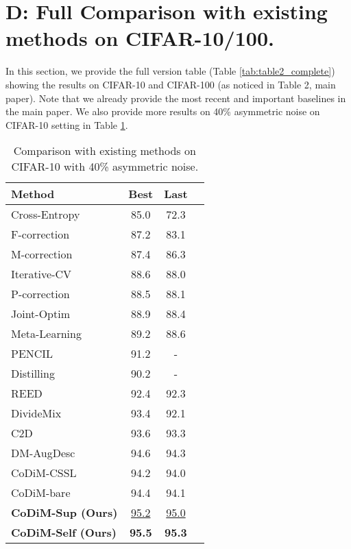 \documentclass[letterpaper]{article} \usepackage{aaai22}  \usepackage{times}  \usepackage{helvet}  \usepackage{courier}  \usepackage[hyphens]{url}  \usepackage{graphicx} \usepackage{subfigure}
\begin{document}
\section{D: Full Comparison with existing methods on CIFAR-10/100.}
In this section, we provide the full version table (Table \ref{tab:table2_complete}) showing the results on CIFAR-10 and CIFAR-100 (as noticed in Table 2, main paper). Note that we already provide the most recent and important baselines in the main paper. We also provide more results on 40\% asymmetric noise on CIFAR-10 setting in Table \ref{tab:table2_complete2_asym}.

\begin{table}[h]
\begin{center}
\begin{tabular}{lccc}
\hline
Method & Best & Last \\
\hline
Cross-Entropy &  85.0 & 72.3 \\
F-correction \cite{patrini2017making} & 87.2 & 83.1 \\
M-correction \cite{arazo2019unsupervised} & 87.4 & 86.3 \\
Iterative-CV \cite{chen2019understanding} & 88.6 & 88.0 \\
P-correction \cite{yi2019probabilistic} & 88.5 & 88.1 \\
Joint-Optim \cite{tanaka2018joint} & 88.9 & 88.4 \\
Meta-Learning \cite{li2019learning} & 89.2 & 88.6 \\
PENCIL & 91.2& - \\
Distilling & 90.2 & - \\
REED \cite{zhang2020decoupling} & 92.4 & 92.3 \\
DivideMix \cite{li2020dividemix} & 93.4 & 92.1 \\
C2D \cite{zhang2020decoupling} & 93.6 & 93.3 \\
DM-AugDesc \cite{nishi2021augmentation} & 94.6 & 94.3 \\
\hline
CoDiM-CSSL & 94.2 & 94.0 \\
CoDiM-bare& 94.4 & 94.1 \\

\textbf{CoDiM-Sup (Ours)} & \underline{95.2} & \underline{95.0} \\
\textbf{CoDiM-Self (Ours)} & \textbf{95.5} & \textbf{95.3} \\
\hline
\end{tabular}
\end{center}
\caption{Comparison with existing methods on CIFAR-10 with 40\% asymmetric noise.}
\label{tab:table2_complete2_asym}
\end{table}
\end{document}
